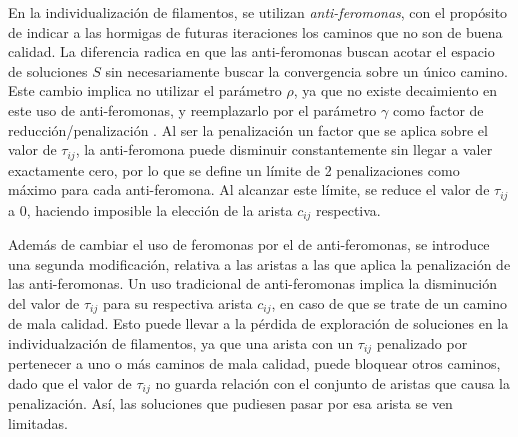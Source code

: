 En la individualizaci\'on de filamentos, se utilizan {\it anti-feromonas}, con el prop\'osito de indicar a las hormigas de futuras iteraciones los caminos que no son de buena calidad. La diferencia radica en que las anti-feromonas buscan acotar el espacio de soluciones $S$ sin necesariamente buscar la convergencia sobre un \'unico camino. Este cambio implica no utilizar el par\'ametro $\rho$, ya que no existe decaimiento en este uso de anti-feromonas, y reemplazarlo por el par\'ametro $\gamma$ como factor de reducci\'on/penalizaci\'on \cite{montgomery2002anti}. Al ser la penalizaci\'on un factor que se aplica sobre el valor de $\tau_{ij}$, la anti-feromona puede disminuir constantemente sin llegar a valer exactamente cero, por lo que se define un l\'imite de 2 penalizaciones como m\'aximo para cada anti-feromona. Al alcanzar este l\'imite, se reduce el valor de $\tau_{ij}$ a 0, haciendo imposible la elecci\'on de la arista $c_{ij}$ respectiva.

Adem\'as de cambiar el uso de feromonas por el de anti-feromonas, se introduce una segunda modificaci\'on, relativa a las aristas a las que aplica la penalizaci\'on de las anti-feromonas. Un uso tradicional de anti-feromonas implica la disminuci\'on del valor de $\tau_{ij}$ para su respectiva arista $c_{ij}$, en caso de que se trate de un camino de mala calidad. 
Esto puede llevar a la p\'erdida de exploraci\'on de soluciones en la individualzaci\'on de filamentos, ya que una arista con un $\tau_{ij}$ penalizado por pertenecer a uno o m\'as caminos de mala calidad, puede bloquear otros caminos, dado que el valor de $\tau_{ij}$ no guarda relaci\'on con el conjunto de aristas que causa la penalizaci\'on. As\'i, las soluciones que pudiesen pasar por esa arista se ven limitadas.

 

